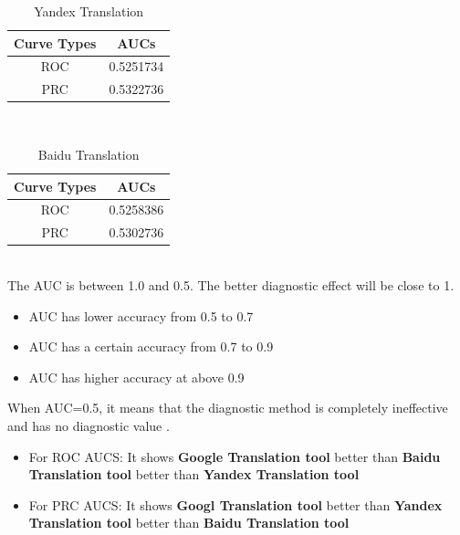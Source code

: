 \documentclass[conference]{IEEEtran}
\begin{document}
\begin{enumerate}
   \begin{table}[h]
      \caption {Yandex Translation}
    \begin{center}
      \begin{tabular}{|c|c|}
        \hline
        Curve Types & AUCs \\
        \hline\hline
        ROC & 0.5251734 \\
        \hline
        PRC & 0.5322736 \\
        \hline
      \end{tabular}
    \end{center}
  \end{table}\\

  \begin{table}[h]
      \caption {Baidu Translation}
    \begin{center}
      \begin{tabular}{|c|c|}
        \hline
        Curve Types & AUCs \\
        \hline\hline
        ROC & 0.5258386 \\
        \hline
        PRC & 0.5302736 \\
        \hline
      \end{tabular}
    \end{center}
  \end{table}\\

  The AUC is between 1.0 and 0.5. The better diagnostic effect will be close to 1.
  \begin{itemize}
  \item AUC has lower accuracy from 0.5 to 0.7
  \item AUC has a certain accuracy from 0.7 to 0.9
  \item AUC has higher accuracy at above 0.9
  \end{itemize}
  When AUC=0.5, it means that the diagnostic method is completely ineffective
  and has no diagnostic value \cite{baiduROC}.
\begin{itemize}
\item For ROC AUCS: It shows \textbf{Google Translation tool} better than
  \textbf{Baidu Translation tool} better than \textbf{Yandex Translation tool}
\item For PRC AUCS: It shows \textbf{Googl Translation tool} better than
  \textbf{Yandex Translation tool} better than \textbf{Baidu Translation tool}
\end{itemize}


\end{enumerate}
\end{document}
